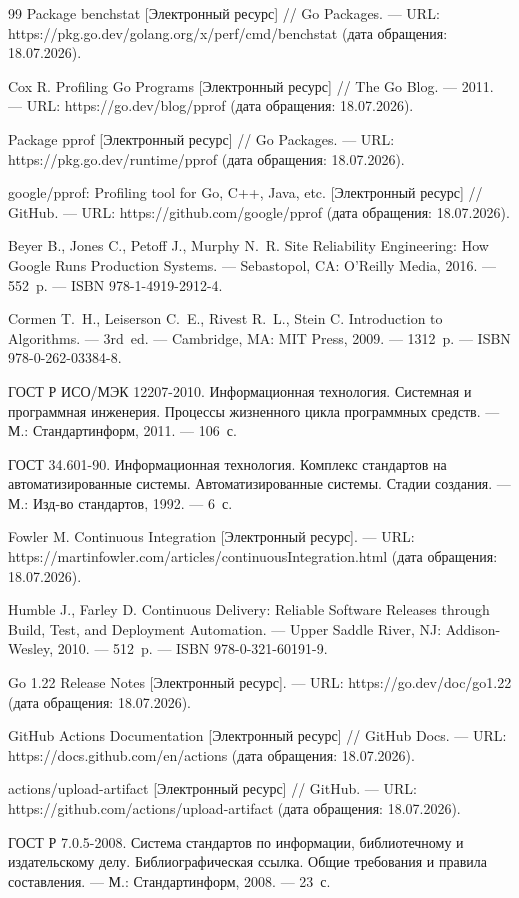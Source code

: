 \begin{thebibliography}{99}
Package benchstat [Электронный ресурс] // Go Packages. --- URL: https://pkg.go.dev/golang.org/x/perf/cmd/benchstat (дата обращения: 18.07.2026).

Cox R. Profiling Go Programs [Электронный ресурс] // The Go Blog. --- 2011. --- URL: https://go.dev/blog/pprof (дата обращения: 18.07.2026).

Package pprof [Электронный ресурс] // Go Packages. --- URL: https://pkg.go.dev/runtime/pprof (дата обращения: 18.07.2026).

google/pprof: Profiling tool for Go, C++, Java, etc. [Электронный ресурс] // GitHub. --- URL: https://github.com/google/pprof (дата обращения: 18.07.2026).

Beyer B., Jones C., Petoff J., Murphy N.~R. Site Reliability Engineering: How Google Runs Production Systems. --- Sebastopol, CA: O'Reilly Media, 2016. --- 552~p. --- ISBN 978-1-4919-2912-4.

Cormen T.~H., Leiserson C.~E., Rivest R.~L., Stein C. Introduction to Algorithms. --- 3rd~ed. --- Cambridge, MA: MIT Press, 2009. --- 1312~p. --- ISBN 978-0-262-03384-8.

ГОСТ Р ИСО/МЭК 12207-2010. Информационная технология. Системная и программная инженерия. Процессы жизненного цикла программных средств. --- М.: Стандартинформ, 2011. --- 106~с.

ГОСТ 34.601-90. Информационная технология. Комплекс стандартов на автоматизированные системы. Автоматизированные системы. Стадии создания. --- М.: Изд-во стандартов, 1992. --- 6~с.

Fowler M. Continuous Integration [Электронный ресурс]. --- URL: https://martinfowler.com/articles/continuousIntegration.html (дата обращения: 18.07.2026).

Humble J., Farley D. Continuous Delivery: Reliable Software Releases through Build, Test, and Deployment Automation. --- Upper Saddle River, NJ: Addison-Wesley, 2010. --- 512~p. --- ISBN 978-0-321-60191-9.

Go 1.22 Release Notes [Электронный ресурс]. --- URL: https://go.dev/doc/go1.22 (дата обращения: 18.07.2026).

GitHub Actions Documentation [Электронный ресурс] // GitHub Docs. --- URL: https://docs.github.com/en/actions (дата обращения: 18.07.2026).

actions/upload-artifact [Электронный ресурс] // GitHub. --- URL: https://github.com/actions/upload-artifact (дата обращения: 18.07.2026).

ГОСТ Р 7.0.5-2008. Система стандартов по информации, библиотечному и издательскому делу. Библиографическая ссылка. Общие требования и правила составления. --- М.: Стандартинформ, 2008. --- 23~с.

\end{thebibliography}
